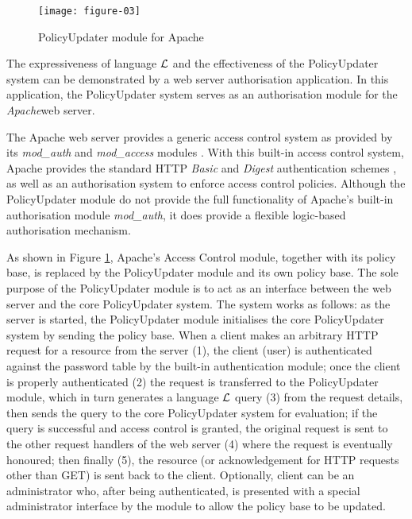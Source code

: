 \documentclass[global,twocolumn,draft]{svjour}
\begin{document}
    \begin{figure}[ht]
      \begin{center}
        \texttt{[image: figure-03]}
        \caption{PolicyUpdater module for Apache}
        \label{fig-3}
      \end{center}
    \end{figure}

    The expressiveness of language $\cal{L}$ and the effectiveness of the
    PolicyUpdater system can be demonstrated by a web server authorisation
    application. In this application, the PolicyUpdater system serves as
    an authorisation module for the {\em Apache}\footnotemark web server.


    The Apache web server provides a generic access control system as provided
    by its {\em mod\_auth} and {\em mod\_access} modules \cite{AP,LAU}. With
    this built-in access control system, Apache provides the standard HTTP
    {\em Basic} and {\em Digest} authentication schemes \cite{HTTP2}, as well
    as an authorisation system to enforce access control policies. Although the
    PolicyUpdater module do not provide the full functionality of Apache's
    built-in authorisation module {\em mod\_auth}, it does provide a flexible
    logic-based authorisation mechanism.

    As shown in Figure \ref{fig-3}, Apache's Access Control module, together
    with its policy base, is replaced by the PolicyUpdater module and its own
    policy base. The sole purpose of the PolicyUpdater module is to act as an
    interface between the web server and the core PolicyUpdater system. The
    system works as follows: as the server is started, the PolicyUpdater
    module initialises the core PolicyUpdater system by sending the policy
    base. When a client makes an arbitrary HTTP request for a resource from
    the server (1), the client (user) is authenticated against the password
    table by the built-in authentication module; once the client is properly
    authenticated (2) the request is transferred to the PolicyUpdater module,
    which in turn generates a language ${\cal L}$ query (3) from the request
    details, then sends the query to the core PolicyUpdater system for
    evaluation; if the query is successful and access control is granted,
    the original request is sent to the other request handlers of the web
    server (4) where the request is eventually honoured; then finally (5),
    the resource (or acknowledgement for HTTP requests other than GET) is sent
    back to the client. Optionally, client can be an administrator who,
    after being authenticated, is presented with a special administrator
    interface by the module to allow the policy base to be updated.
\end{document}
